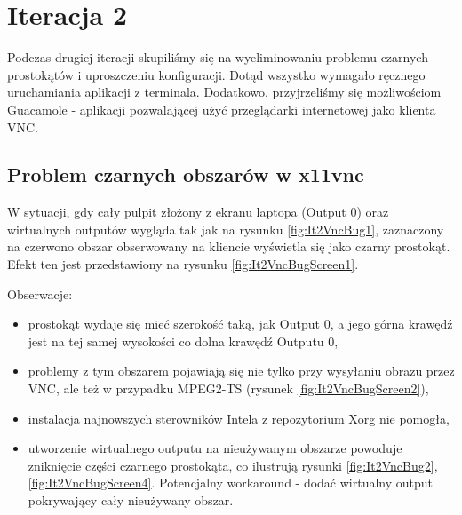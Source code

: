 \section{Iteracja 2}

  Podczas drugiej iteracji skupiliśmy się na wyeliminowaniu problemu czarnych prostokątów i uproszczeniu konfiguracji. Dotąd wszystko wymagało ręcznego uruchamiania aplikacji z terminala. Dodatkowo, przyjrzeliśmy się możliwościom Guacamole - aplikacji pozwalającej użyć przeglądarki internetowej jako klienta VNC.

  \subsection{Problem czarnych obszarów w x11vnc}

    W sytuacji, gdy cały pulpit złożony z ekranu laptopa (Output 0) oraz wirtualnych outputów wygląda tak jak na rysunku \ref{fig:It2VncBug1}, zaznaczony na czerwono obszar obserwowany na kliencie wyświetla się jako czarny prostokąt. Efekt ten jest przedstawiony na rysunku \ref{fig:It2VncBugScreen1}.

    \vfill

    Obserwacje:
    \begin{itemize}
      \item prostokąt wydaje się mieć szerokość taką, jak Output 0, a jego górna krawędź jest na tej samej wysokości co dolna krawędź Outputu 0,
      \item problemy z tym obszarem pojawiają się nie tylko przy wysyłaniu obrazu przez VNC, ale też w przypadku MPEG2-TS (rysunek \ref{fig:It2VncBugScreen2}),
      \item instalacja najnowszych sterowników Intela z repozytorium Xorg nie pomogła,
     \item utworzenie wirtualnego outputu na nieużywanym obszarze powoduje zniknięcie części czarnego prostokąta, co ilustrują rysunki \ref{fig:It2VncBug2}, \ref{fig:It2VncBugScreen4}. Potencjalny workaround - dodać wirtualny output pokrywający cały nieużywany obszar.
    \end{itemize}

